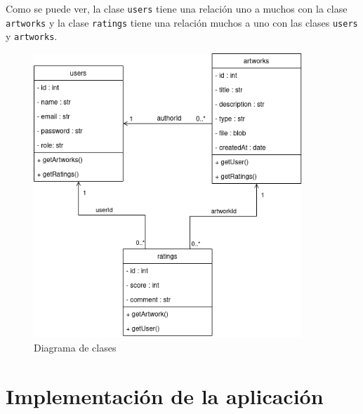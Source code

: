 Como se puede ver, la clase \texttt{users} tiene una relación uno a muchos
con la clase \texttt{artworks} y la clase \texttt{ratings} tiene una relación muchos a
uno con las clases \texttt{users} y \texttt{artworks}.

\begin{figure}[H]
  \centering
  \includegraphics[width=0.9\textwidth]{diagramas/diagrama_clases}
  \caption{Diagrama de clases}
  \label{fig:class-diagram}
\end{figure}

\section{Implementación de la aplicación}

